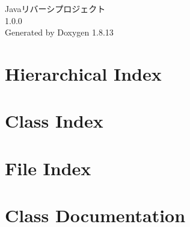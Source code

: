 \documentclass[twoside]{book}
\newcommand{\+}{\discretionary{\mbox{\scriptsize$\hookleftarrow$}}{}{}}
\newcommand{\clearemptydoublepage}{%
  \newpage{\pagestyle{empty}\cleardoublepage}%
}
\begin{document}
\hypersetup{pageanchor=false,
             bookmarksnumbered=true,
             pdfencoding=unicode
            }
\begin{titlepage}
\vspace*{7cm}
\begin{center}%
{\Large Javaリバーシプロジェクト \\[1ex]\large 1.\+0.\+0 }\\
\vspace*{1cm}
{\large Generated by Doxygen 1.8.13}\\
\end{center}
\end{titlepage}
\clearemptydoublepage
{}
\tableofcontents
\clearemptydoublepage
{}
\hypersetup{pageanchor=true}

\chapter{Hierarchical Index}

\chapter{Class Index}

\chapter{File Index}

\chapter{Class Documentation}













\end{document}
